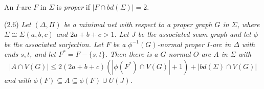 An $I$-arc $F$ in $\Sigma$ is \textit{proper} if $|F \cap bd(\Sigma)| = 2$.

\stmt
(2.6) \textit{Let $(\Delta, \Pi)$ be a minimal net with respect to a proper graph $G$ in $\Sigma$, where $\Sigma \cong \Sigma(a, b, c)$ and $2a + b + c > 1$. Let $J$ be the associated seam graph and let $\phi$ be the associated surjection. Let $F$ be a $\phi^{-1}(G)$-normal proper $I$-arc in $\Delta$ with ends $s, t$, and let $F^* = F - \{s, t\}$. Then there is a $G$-normal $O$-arc $A$ in $\Sigma$ with}
\begin{equation*}
|A \cap V(G)| \le 2(2a + b + c)(|\phi(F^*) \cap V(G)| + 1) + |bd(\Sigma) \cap V(G)|
\end{equation*}
\textit{and with $\phi(F) \subseteq A \subseteq \phi(F) \cup U(J)$.}

